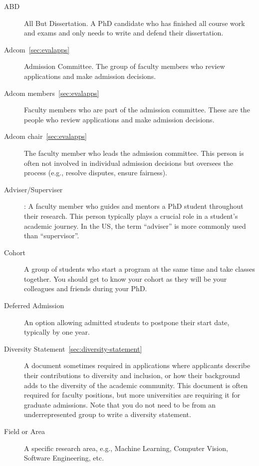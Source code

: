 \documentclass[oneside,11pt,dvipsnames]{book}
\begin{document}
\begin{description}

  \item[ABD] All But Dissertation. A PhD candidate who has finished all course work and exams and only needs to write and defend their dissertation.

  \item[Adcom~\autoref{sec:evalapps}] Admission Committee. The group of faculty members who review applications and make admission decisions.
  
  \item [Adcom members~\autoref{sec:evalapps}] Faculty members who are part of the admission committee. These are the people who review applications and make admission decisions.
  
  \item[Adcom chair~\autoref{sec:evalapps}] The faculty member who leads the admission committee. This person is often not involved in individual admission decisions but oversees the process (e.g., resolve disputes, ensure fairness).
  
  \item[Adviser/Superviser]: A faculty member who guides and mentors a PhD student throughout their research. This person typically plays a crucial role in a student's academic journey. In the US, the term ``adviser'' is more commonly used than ``supervisor''.
  
  \item[Cohort] A group of students who start a program at the same time and take classes together. You should get to know your cohort as they will be your colleagues and friends during your PhD.
  
  \item [Deferred Admission] An option allowing admitted students to postpone their start date, typically by one year.
  
  \item [Diversity Statement~\autoref{sec:diversity-statement}] A document sometimes required in applications where applicants describe their contributions to diversity and inclusion, or how their background adds to the diversity of the academic community. This document is often required for faculty positions, but more universities are requiring it for graduate admissions. Note that you do not need to be from an underrepresented group to write a diversity statement.
  
  \item[Field or Area] A specific research area, e.g., Machine Learning, Computer Vision, Software Engineering, etc.
  

\end{description}
\end{document}
